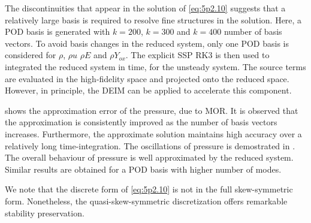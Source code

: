 The discontinuities that appear in the solution of \eqref{eq:5p2.10} suggests that a relatively large basis is required to resolve fine structures in the solution. Here, a POD basis is generated with $k=200$, $k=300$ and $k=400$ number of basis vectors. To avoid basis changes in the reduced system, only one POD basis is considered for $\rho$, $\rho u$ $\rho E$ and $\rho Y_{ox}$. The explicit SSP RK3 is then used to integrated the reduced system in time, for the unsteady system. The source terms are evaluated in the high-fidelity space and projected onto the reduced space. However, in principle, the DEIM can be applied to accelerate this component. 

 shows the approximation error of the pressure, due to MOR. It is observed that the approximation is consistently improved as the number of basis vectors increases. Furthermore, the approximate solution maintains high accuracy over a relatively long time-integration. The oscillations of pressure is demostrated in . The overall behaviour of pressure is well approximated by the reduced system. Similar results are obtained for a POD basis with higher number of modes.

We note that the discrete form of \eqref{eq:5p2.10} is not in the full skew-symmetric form. Nonetheless, the quasi-skew-symmetric discretization offers remarkable stability preservation.

